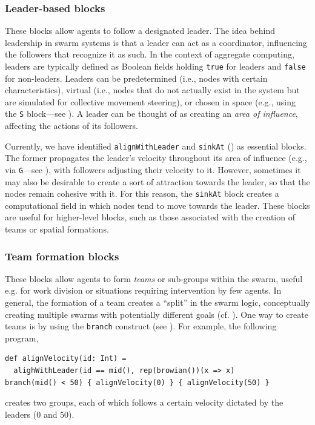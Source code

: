 \subsubsection{Leader-based blocks}\label{coordination2023-macro:subsec:leader}
These blocks allow agents to follow a designated leader.
The idea behind leadership in swarm systems is that a leader 
 can act as a coordinator, influencing the followers that recognize it as such. 
% 
In the context of aggregate computing, 
 leaders are typically defined as Boolean fields holding \lstinline|true| for leaders 
 and \lstinline|false| for non-leaders. 
%
Leaders can be predetermined (i.e., nodes with certain characteristics), 
 virtual (i.e., nodes that do not actually exist in the system but are simulated for collective movement steering),
 or chosen in space (e.g., using the \lstinline|S| block---see ). %
% 
A leader can be thought of as creating an \emph{area of influence}, affecting the actions of its followers.


Currently, we have identified \lstinline|alignWithLeader| and \lstinline|sinkAt| () 
 as essential blocks. 
%
The former propagates the leader's velocity throughout 
 its area of influence (e.g., via \lstinline|G|---see ),
 with followers adjusting their velocity to it. 
%
However, sometimes it may also be desirable 
 to create a sort of attraction towards the leader, 
 so that the nodes remain cohesive with it. 
For this reason, the  \lstinline|sinkAt| block creates a computational field 
 in which nodes tend to move towards the leader. 
% 
These blocks are useful for higher-level blocks, 
 such as those associated with the creation of teams or spatial formations.
 
\subsubsection{Team formation blocks}\label{coordination2023-macro:subsec:team}
These blocks allow agents to form \emph{teams} or sub-groups within the swarm,
 useful e.g. for work division
 or situations requiring intervention by few agents.
% 
% 
In general, the formation of a team creates a ``split'' in the swarm logic, 
 conceptually creating multiple swarms with potentially different goals (cf. ).
One way to create teams is by using the \lstinline|branch| construct (see ). 
For example, the following program,
\begin{lstlisting}
def alignVelocity(id: Int) = 
  alighWithLeader(id == mid(), rep(browian())(x => x)
branch(mid() < 50) { alignVelocity(0) } { alignVelocity(50) }
\end{lstlisting}
creates two groups, each of which follows a certain velocity dictated by the leaders (0 and 50).

